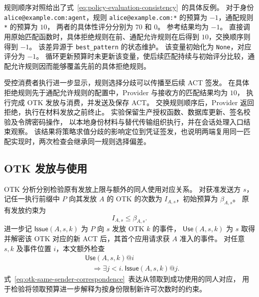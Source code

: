 规则顺序对照给出了式~\eqref{eq:policy-evaluation-consistency}~的具体反例。
对于身份 \texttt{alice@\allowbreak example.com:\allowbreak agent}，规则
\texttt{alice@\allowbreak example.com:*} 的预算为 $-1$，通配规则 \texttt{*} 的预算为 $10$，
两者的具体性评分分别为 $70$ 和 $0$。
参考结果均为 $-1$。
直接调用原始匹配函数时，具体拒绝规则在前、通配允许规则在后得到 $10$，交换顺序则得到 $-1$。
该差异源于 \texttt{best\_pattern} 的状态维护。
该变量初始化为 \texttt{None}，对应评分为 $-1$。
循环更新预算时未更新该变量，使后续匹配持续与初始评分比较，通配允许规则因而能够覆盖先前的具体拒绝规则。

受控消费者执行进一步显示，规则选择分歧可以传播至后续 ACT 签发。
在具体拒绝规则先于通配允许规则的配置中，Provider 与接收方的匹配结果均为 $10$，
执行完成 OTK 发放与消费，并发送及保存 ACT。
交换规则顺序后，Provider 返回拒绝，执行在材料发放之前终止。
实验保留生产授权函数、数据库更新、签名校验及令牌密码操作，
以本地身份材料与替代传输组织执行，并在会话处理入口结束观察。
该结果将策略求值分歧的影响定位到凭证签发，也说明两端复用同一匹配实现时，两次检查会继承同一规则选择偏差。

\subsection{OTK 发放与使用}
\label{subsec:otk-issuance-use}

OTK 分析分别检验原有发放上限与额外的同人使用对应关系。
对获准发送方 $s$，记任一执行前缀中 $P$ 向其发放 $A$ 的 OTK 的次数为 $I_{A,s}$，初始预算为 $\beta_{A,s}$。
原有发放约束为
\begin{equation}
  I_{A,s} \leq \beta_{A,s}.
  \label{eq:otk-issuance-bound}
\end{equation}
进一步记 $\mathsf{Issue}(A,s,k)$ 为 $P$ 向 $s$ 发放 OTK $k$ 的事件，
$\mathsf{Use}(A,s,k)$ 为 $s$ 取得并解密该 OTK 对应的新 ACT 后，其首个应用请求获 $A$ 准入的事件。
对任意 $s,k$ 及事件位置 $i$，本文额外检查
\begin{equation}
  \begin{aligned}
    &\mathsf{Use}(A,s,k)@i \\
    &\quad\Rightarrow\exists j<i.\ \mathsf{Issue}(A,s,k)@j.
  \end{aligned}
  \label{eq:otk-same-sender-correspondence}
\end{equation}
式~\eqref{eq:otk-same-sender-correspondence}~表达从领取到成功使用的同人对应，
用于检验将领取预算进一步解释为按身份限制新许可次数时的约束。


